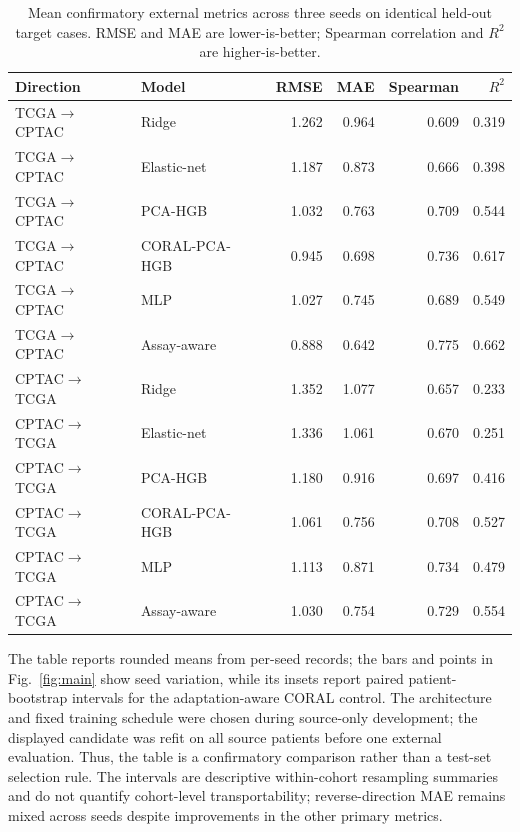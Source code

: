 \documentclass[11pt]{article}
\begin{document}
\begin{table}[t]
\centering
\caption{Mean confirmatory external metrics across three seeds on identical held-out target cases. RMSE and MAE are lower-is-better; Spearman correlation and $R^2$ are higher-is-better.}
\label{tab:baseline}
\begin{tabular}{llrrrr}
\toprule
Direction & Model & RMSE & MAE & Spearman & $R^2$\\
\midrule
TCGA$\rightarrow$CPTAC & Ridge & 1.262 & 0.964 & 0.609 & 0.319\\
TCGA$\rightarrow$CPTAC & Elastic-net & 1.187 & 0.873 & 0.666 & 0.398\\
TCGA$\rightarrow$CPTAC & PCA-HGB & 1.032 & 0.763 & 0.709 & 0.544\\
TCGA$\rightarrow$CPTAC & CORAL-PCA-HGB & 0.945 & 0.698 & 0.736 & 0.617\\
TCGA$\rightarrow$CPTAC & MLP & 1.027 & 0.745 & 0.689 & 0.549\\
TCGA$\rightarrow$CPTAC & Assay-aware & 0.888 & 0.642 & 0.775 & 0.662\\
\midrule
CPTAC$\rightarrow$TCGA & Ridge & 1.352 & 1.077 & 0.657 & 0.233\\
CPTAC$\rightarrow$TCGA & Elastic-net & 1.336 & 1.061 & 0.670 & 0.251\\
CPTAC$\rightarrow$TCGA & PCA-HGB & 1.180 & 0.916 & 0.697 & 0.416\\
CPTAC$\rightarrow$TCGA & CORAL-PCA-HGB & 1.061 & 0.756 & 0.708 & 0.527\\
CPTAC$\rightarrow$TCGA & MLP & 1.113 & 0.871 & 0.734 & 0.479\\
CPTAC$\rightarrow$TCGA & Assay-aware & 1.030 & 0.754 & 0.729 & 0.554\\
\bottomrule
\end{tabular}
\end{table}

The table reports rounded means from per-seed records; the bars and points in Fig.~\ref{fig:main} show seed variation, while its insets report paired patient-bootstrap intervals for the adaptation-aware CORAL control. The architecture and fixed training schedule were chosen during source-only development; the displayed candidate was refit on all source patients before one external evaluation. Thus, the table is a confirmatory comparison rather than a test-set selection rule. The intervals are descriptive within-cohort resampling summaries and do not quantify cohort-level transportability; reverse-direction MAE remains mixed across seeds despite improvements in the other primary metrics.
\end{document}
